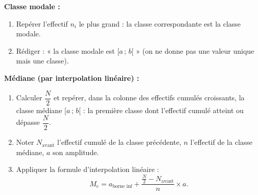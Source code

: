 \documentclass[11pt]{article}
\newcommand{\cle}[1]{{\popxbold\color{popdark}#1}}
\begin{document}
\begin{methode}
\textbf{Classe modale :}
\begin{enumerate}
\item Repérer l'effectif $n_i$ le plus grand : la classe correspondante est la \cle{classe modale}.
\item Rédiger : « la classe modale est $[a\,;\,b[$ » (on ne donne pas une valeur unique mais une classe).
\end{enumerate}
\textbf{Médiane (par interpolation linéaire) :}
\begin{enumerate}
\item Calculer $\dfrac{N}{2}$ et repérer, dans la colonne des effectifs cumulés croissants, la \cle{classe médiane} $[a\,;\,b[$ : la première classe dont l'effectif cumulé atteint ou dépasse $\dfrac{N}{2}$.
\item Noter $N_{\text{avant}}$ l'effectif cumulé de la classe précédente, $n$ l'effectif de la classe médiane, $a$ son amplitude.
\item Appliquer la formule d'\cle{interpolation linéaire} :
\[ M_e = a_{\text{borne inf}} + \dfrac{\frac{N}{2}-N_{\text{avant}}}{n}\times a. \]
\end{enumerate}
\end{methode}
\end{document}
